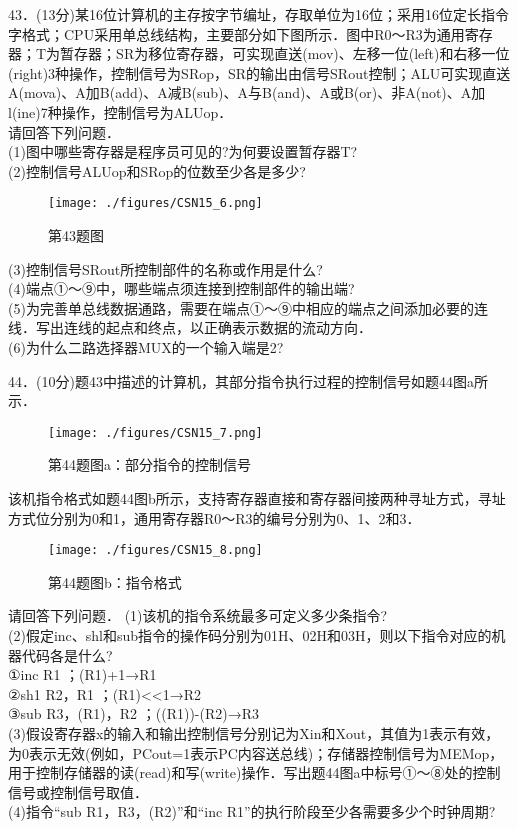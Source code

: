43．(13分)某16位计算机的主存按字节编址，存取单位为16位；采用16位定长指令字格式；CPU采用单总线结构，主要部分如下图所示．图中R0～R3为通用寄存器；T为暂存器；SR为移位寄存器，可实现直送(mov)、左移一位(left)和右移一位(right)3种操作，控制信号为SRop，SR的输出由信号SRout控制；ALU可实现直送A(mova)、A加B(add)、A减B(sub)、A与B(and)、A或B(or)、非A(not)、A加l(ine)7种操作，控制信号为ALUop． \\
请回答下列问题． \\
(1)图中哪些寄存器是程序员可见的?为何要设置暂存器T? \\
(2)控制信号ALUop和SRop的位数至少各是多少?
\begin{figure}[ht]
\centering
\texttt{[image: ./figures/CSN15\_6.png]}
\caption{第43题图} \label{CSN15_fig6}
\end{figure}
(3)控制信号SRout所控制部件的名称或作用是什么? \\
(4)端点①～⑨中，哪些端点须连接到控制部件的输出端? \\
(5)为完善单总线数据通路，需要在端点①～⑨中相应的端点之间添加必要的连线．写出连线的起点和终点，以正确表示数据的流动方向． \\
(6)为什么二路选择器MUX的一个输入端是2?

44．(10分)题43中描述的计算机，其部分指令执行过程的控制信号如题44图a所示．
\begin{figure}[ht]
\centering
\texttt{[image: ./figures/CSN15\_7.png]}
\caption{第44题图a：部分指令的控制信号} \label{CSN15_fig7}
\end{figure}
该机指令格式如题44图b所示，支持寄存器直接和寄存器间接两种寻址方式，寻址方式位分别为0和1，通用寄存器R0～R3的编号分别为0、1、2和3．
\begin{figure}[ht]
\centering
\texttt{[image: ./figures/CSN15\_8.png]}
\caption{第44题图b：指令格式} \label{CSN15_fig8}
\end{figure}
请回答下列问题．
(1)该机的指令系统最多可定义多少条指令? \\
(2)假定inc、shl和sub指令的操作码分别为01H、02H和03H，则以下指令对应的机器代码各是什么? \\
①inc R1 ；(R1)+1→R1 \\
②sh1 R2，R1 ；(R1)<<1→R2 \\
③sub R3，(R1)，R2 ；((R1))-(R2)→R3 \\
(3)假设寄存器x的输入和输出控制信号分别记为Xin和Xout，其值为1表示有效，为0表示无效(例如，PCout=1表示PC内容送总线)；存储器控制信号为MEMop，用于控制存储器的读(read)和写(write)操作．写出题44图a中标号①～⑧处的控制信号或控制信号取值． \\
(4)指令“sub R1，R3，(R2)”和“inc R1”的执行阶段至少各需要多少个时钟周期?

